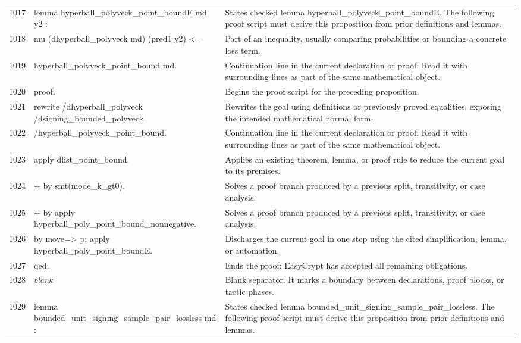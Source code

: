 \documentclass[10pt]{article}
\begin{document}
\begin{longtable}{r L{0.53\textwidth} L{0.37\textwidth}}
1017 & {\ttfamily\scriptsize lemma hyperball\_polyveck\_point\_boundE md y2 :} & States checked lemma hyperball\_polyveck\_point\_boundE.  The following proof script must derive this proposition from prior definitions and lemmas. \\
1018 & {\ttfamily\scriptsize   mu (dhyperball\_polyveck md) (pred1 y2) <=} & Part of an inequality, usually comparing probabilities or bounding a concrete loss term. \\
1019 & {\ttfamily\scriptsize   hyperball\_polyveck\_point\_bound md.} & Continuation line in the current declaration or proof.  Read it with surrounding lines as part of the same mathematical object. \\
1020 & {\ttfamily\scriptsize proof.} & Begins the proof script for the preceding proposition. \\
1021 & {\ttfamily\scriptsize rewrite /dhyperball\_polyveck /dsigning\_bounded\_polyveck} & Rewrites the goal using definitions or previously proved equalities, exposing the intended mathematical normal form. \\
1022 & {\ttfamily\scriptsize         /hyperball\_polyveck\_point\_bound.} & Continuation line in the current declaration or proof.  Read it with surrounding lines as part of the same mathematical object. \\
1023 & {\ttfamily\scriptsize apply dlist\_point\_bound.} & Applies an existing theorem, lemma, or proof rule to reduce the current goal to its premises. \\
1024 & {\ttfamily\scriptsize + by smt(mode\_k\_gt0).} & Solves a proof branch produced by a previous split, transitivity, or case analysis. \\
1025 & {\ttfamily\scriptsize + by apply hyperball\_poly\_point\_bound\_nonnegative.} & Solves a proof branch produced by a previous split, transitivity, or case analysis. \\
1026 & {\ttfamily\scriptsize by move=> p; apply hyperball\_poly\_point\_boundE.} & Discharges the current goal in one step using the cited simplification, lemma, or automation. \\
1027 & {\ttfamily\scriptsize qed.} & Ends the proof; EasyCrypt has accepted all remaining obligations. \\
1028 & {\ttfamily\scriptsize \emph{blank}} & Blank separator.  It marks a boundary between declarations, proof blocks, or tactic phases. \\
1029 & {\ttfamily\scriptsize lemma bounded\_unit\_signing\_sample\_pair\_lossless md :} & States checked lemma bounded\_unit\_signing\_sample\_pair\_lossless.  The following proof script must derive this proposition from prior definitions and lemmas. \\

\end{longtable}
\end{document}

